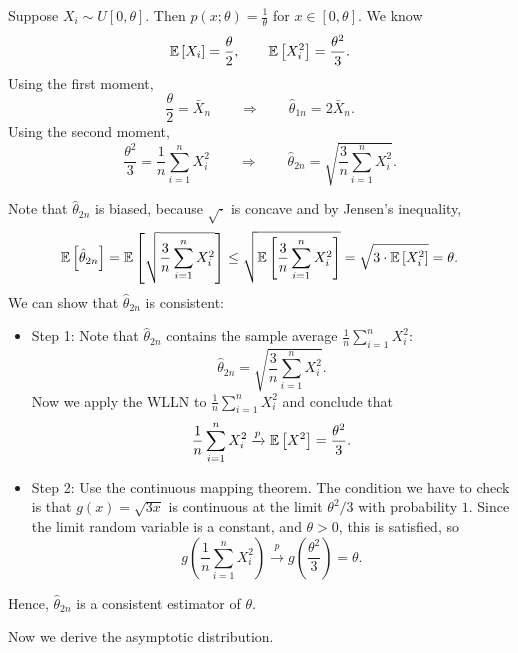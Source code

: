 \begin{example}	Suppose $X_i\sim U[0,\theta]$. Then $p(x;\theta)=\frac{1}{\theta}$ for $x\in[0,\theta]$.
	We know
	\[
		\mathbb{E}\left[X_i\right]=\frac{\theta}{2},
		\qquad
		\mathbb{E}\left[X_i^2\right]=\frac{\theta^2}{3}.
	\]
	Using the first moment,
	\[
		\frac{\theta}{2}=\bar X_n
		\qquad\Rightarrow\qquad
		\hat\theta_{1n}=2\bar X_n.
	\]
	Using the second moment,
	\[
		\frac{\theta^2}{3}=\frac{1}{n}\sum_{i=1}^n X_i^2
		\qquad\Rightarrow\qquad
		\hat\theta_{2n}=\sqrt{\frac{3}{n}\sum_{i=1}^n X_i^2}.
	\]

	Note that $\hat\theta_{2n}$ is biased, because $\sqrt{\cdot}$ is concave and by Jensen's inequality,
	\[
		\mathbb{E}\left[\hat\theta_{2n}\right]
		=
		\mathbb{E}\left[\sqrt{\frac{3}{n}\sum_{i=1}^n X_i^2}\right]
		\le
		\sqrt{\mathbb{E}\left[\frac{3}{n}\sum_{i=1}^n X_i^2\right]}
		=
		\sqrt{3\cdot \mathbb{E}\left[X_i^2\right]}
		=
		\theta.
	\]
	We can show that $\hat{\theta}_{2n}$ is consistent:
	\begin{itemize}
		\item Step 1: Note that $\hat\theta_{2n}$ contains the sample average $\frac{1}{n}\sum_{i=1}^n X_i^2$:
		      \[
			      \hat\theta_{2n}=\sqrt{\frac{3}{n}\sum_{i=1}^n X_i^2}.
		      \]
		      Now we apply the WLLN to $\frac{1}{n}\sum_{i=1}^n X_i^2$ and conclude that
		      \[
			      \frac{1}{n}\sum_{i=1}^n X_i^2 \xrightarrow{p} \mathbb{E}\left[X^2\right]=\frac{\theta^2}{3}.
		      \]
		\item Step 2: Use the continuous mapping theorem. The condition we have to check is that $g(x)=\sqrt{3x}$ is continuous at the limit $\theta^2/3$ with probability $1$. Since the limit random variable is a constant, and $\theta>0$, this is satisfied, so
		      \[
			      g\left(\frac{1}{n}\sum_{i=1}^n X_i^2\right)\xrightarrow{p} g\left(\frac{\theta^2}{3}\right)=\theta.
		      \]
	  \end{itemize}
	Hence, $\hat\theta_{2n}$ is a consistent estimator of $\theta$.

	Now we derive the asymptotic distribution.


\end{example}
